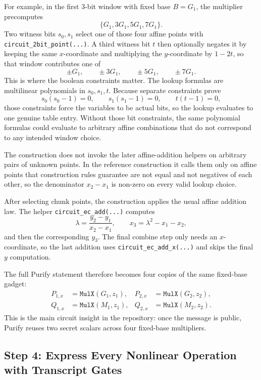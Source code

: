 \documentclass[11pt]{article}
\begin{document}
For example, in the first 3-bit window with fixed base $B = G_1$, the multiplier precomputes
\[
\{G_1, 3G_1, 5G_1, 7G_1\}.
\]
Two witness bits $s_0,s_1$ select one of those four affine points with
\texttt{circuit\_2bit\_point(...)}. A third witness bit $t$ then optionally negates it by keeping
the same $x$-coordinate and multiplying the $y$-coordinate by $1 - 2t$, so that window contributes
one of
\[
\pm G_1, \qquad \pm 3G_1, \qquad \pm 5G_1, \qquad \pm 7G_1.
\]
This is where the boolean constraints matter. The lookup formulas are multilinear polynomials in
$s_0,s_1,t$. Because separate constraints prove
\[
s_0(s_0-1)=0, \qquad s_1(s_1-1)=0, \qquad t(t-1)=0,
\]
those constraints force the variables to be actual bits, so the lookup evaluates to one genuine
table entry.
Without those bit constraints, the same polynomial formulas could evaluate to arbitrary affine
combinations that do not correspond to any intended window choice.

The construction does not invoke the later affine-addition helpers on arbitrary pairs of unknown
points. In the reference construction it calls them only on affine points that construction rules
guarantee are not equal and not negatives of each other, so the denominator $x_2-x_1$ is non-zero on
every valid lookup choice.

After selecting chunk points, the construction applies the usual affine addition law. The helper
\texttt{circuit\_ec\_add(...)} computes
\[
\lambda = \frac{y_2-y_1}{x_2-x_1}, \qquad
x_3 = \lambda^2 - x_1 - x_2,
\]
and then the corresponding $y_3$. The final combine step only needs an $x$-coordinate, so the last
addition uses \texttt{circuit\_ec\_add\_x(...)} and skips the final $y$ computation.

The full Purify statement therefore becomes four copies of the same fixed-base gadget:
\[
\begin{aligned}
P_{1,x} &= \texttt{MulX}(G_1,z_1), & P_{2,x} &= \texttt{MulX}(G_2,z_2), \\
Q_{1,x} &= \texttt{MulX}(M_1,z_1), & Q_{2,x} &= \texttt{MulX}(M_2,z_2).
\end{aligned}
\]
This is the main circuit insight in the repository: once the message is public, Purify reuses two
secret scalars across four fixed-base multipliers.

\subsection{Step 4: Express Every Nonlinear Operation with Transcript Gates}
\end{document}
